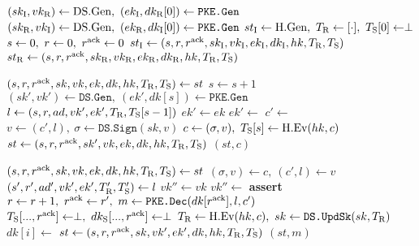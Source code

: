 \algrenewcommand\textproc{}
\algrenewcommand{}

\begin{minipage}{1\linewidth}
  {\fontsize{10}{12}\selectfont

  \begin{algorithmic}[1]
    \State $(sk_\t{I},vk_\t{R}) \gets \t{DS.Gen}, \ (ek_\t{I},dk_\t{R}[0]) \gets \texttt{PKE.Gen}$
    \State $(sk_\t{R},vk_\t{I}) \gets \t{DS.Gen}, \ (ek_\t{R},dk_\t{I}[0]) \gets \texttt{PKE.Gen}$
    \State $st_\text{I} \gets \text{H.Gen}, \ T_\text{R} \gets [\cdot], \ T_\text{S}[0] \gets \perp$
    \State $s \gets 0, \ r \gets 0, \ r^\t{ack} \gets 0$
    \State $st_\text{I} \gets (s,r,r^\text{ack},sk_\text{I},vk_\text{I},ek_\text{I},dk_\text{I},hk,T_\text{R},T_\text{S})$
    \State $st_\text{R} \gets (s,r,r^\text{ack},sk_\text{R},vk_\text{R},ek_\text{R},dk_\text{R},hk,T_\text{R},T_\text{S})$
    \EndProcedure
    
    \item[]
    
    \State $(s,r,r^\text{ack},sk,vk,ek,dk,hk,T_\text{R},T_\text{S}) \gets st$
    \State $s \gets s+1$
    \State $(sk',vk') \gets \texttt{DS.Gen}, \ (ek',dk[s]) \gets \texttt{PKE.Gen}$
    \State $l \gets (s,r,ad,vk',ek',T_\text{R},T_\text{S}[s-1])$
    \State $ek' \gets ek$
    \State $ek' \gets$ 
    \EndFor
    \State $c' \gets$ 
    \State $v \gets (c',l), \ \sigma \gets \texttt{DS.Sign}(sk,v)$
    \State $c \gets (\sigma,v), \ T_\text{S}[s] \gets \text{H.Ev}(hk,c)$
    \State $st \gets (s,r,r^\text{ack},sk',vk,ek,dk,hk,T_\text{R},T_\text{S})$
    \State \Return $(st,c)$
    \EndProcedure

    \item[]

    \State $(s,r,r^\text{ack},sk,vk,ek,dk,hk,T_\text{R},T_\text{S}) \gets st$
    \State $(\sigma,v) \gets c, \ (c',l) \gets v$
    \State $(s',r',ad',vk',ek',T_\text{R}',T_\text{S}') \gets l$
    \State $vk'' \gets vk$
    \State $vk'' \gets$ 
    \EndFor
    \State \textbf{assert} 
    \State $r \gets r+1, \ r^\t{ack} \gets r' , \ m \gets \texttt{PKE.Dec}(dk[r^\t{ack}],l,c')$
    \State $T_\t{S}[...,r^\t{ack}] \gets \perp, \ dk_\t{S}[...,r^\t{ack}] \gets \perp$
    \State $T_\text{R} \gets \text{H.Ev}(hk,c), \ sk \gets \texttt{DS.UpdSk}(sk,T_\text{R})$
    \State $dk[i] \gets$ 
    \EndFor
    \State $st \gets (s,r,r^\text{ack},sk,vk',ek',dk,hk,T_\text{R},T_\text{S})$
    \State \Return $(st,m)$
    \EndProcedure

  \end{algorithmic}
  }
\end{minipage}